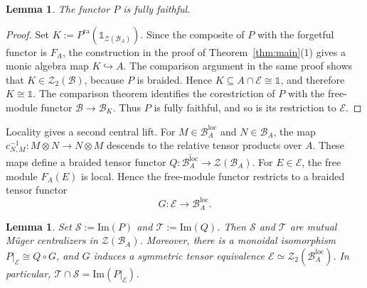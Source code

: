 \documentclass[11pt,reqno]{amsart}
\numberwithin{equation}{section}
\theoremstyle{plain}
\newtheorem{lemma}[thmctr]{Lemma}
\theoremstyle{definition}
\theoremstyle{remark}
\newcommand{\unit}{\mathds{1}}
\newcommand{\B}{\mathcal{B}}
\newcommand{\C}{\mathcal{C}}
\newcommand{\E}{\mathcal{E}}
\newcommand{\Z}{\mathcal{Z}}
\newcommand{\T}{\mathcal{T}}
\newcommand{\cS}{\mathcal{S}}
\newcommand{\loc}{\mathrm{loc}}
\newcommand{\ra}{\mathrm{ra}}
\newcommand{\im}{\mathrm{Im}}
\begin{document}
\begin{lemma}\label{lem:relative-positive-lift}
The functor $P$ is fully faithful. 
\end{lemma}

\begin{proof}
Set $K:=P^{\ra}(\unit_{\Z(\B_A)})$. Since the composite of $P$ with the
forgetful functor is $F_A$, the construction in the proof of
Theorem~\ref{thm:main}(1) gives a monic algebra map $K\hookrightarrow A$.
The comparison argument in the same proof shows that $K\in\Z_2(\B)$,
because $P$ is braided. Hence $K\subseteq A\cap\E\cong\unit$, and therefore
$K\cong\unit$. The comparison theorem
\cite[Proposition~6.6]{shimizu2026commutative} identifies the corestriction
of $P$ with the free-module functor $\B\to\B_K$. Thus $P$ is fully faithful,
and so is its restriction to $\E$.
\end{proof}

Locality gives a second central lift. For $M\in\B_A^\loc$ and $N\in\B_A$, the map
$c_{N,M}^{-1}:M\otimes N\to N\otimes M$ descends to the relative tensor
products over $A$. These maps define a braided tensor functor $Q:\overline{\B_A^\loc}\longrightarrow\Z(\B_A)$. 
For $E\in\E$, the free module $F_A(E)$ is local. Hence the free-module
functor restricts to a braided tensor functor
\[
  G:\E\longrightarrow\B_A^\loc.
\]

\begin{lemma}\label{lem:relative-mutual-centralizers}
Set $\cS:=\im(P)$ and $\T:=\im(Q)$. Then $\cS$ and $\T$ are mutual
M\"uger centralizers in $\Z(\B_A)$.
Moreover, there is a monoidal isomorphism $P|_{\E}\cong Q\circ G$, 
and $G$ induces a symmetric tensor equivalence
$\E\simeq\Z_2(\B_A^\loc)$. 
In particular, $\T\cap\cS=\im(P |_\E)$.
\end{lemma}
\end{document}
